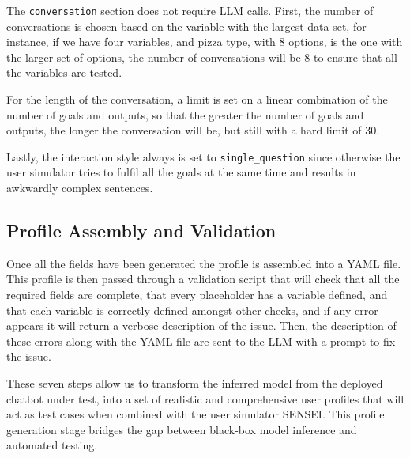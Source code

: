 The \texttt{conversation} section does not require \ac{LLM} calls.
First, the number of conversations is chosen
based on the variable with the largest data set,
for instance, if we have four variables,
and pizza type, with $8$ options, is the one with the larger set of options,
the number of conversations will be $8$ to ensure that all the variables are tested.

For the length of the conversation,
a limit is set on a linear combination
of the number of goals and outputs,
so that the greater the number of goals and outputs,
the longer the conversation will be,
but still with a hard limit of $30$.

Lastly, the interaction style always is set to \texttt{single\_question}
since otherwise the user simulator tries to
fulfil all the goals at the same time
and results in awkwardly complex sentences.

\subsection{Profile Assembly and Validation}

Once all the fields have been generated
the profile is assembled into a YAML file.
This profile is then passed through a validation script
that will check that all the required fields are complete,
that every placeholder has a variable defined,
and that each variable is correctly defined
amongst other checks,
and if any error appears it will return a verbose description of the issue.
Then, the description of these errors along with the YAML file
are sent to the \ac{LLM} with a prompt to fix the issue.


These seven steps allow us to transform the inferred model
from the deployed chatbot under test,
into a set of realistic and comprehensive user profiles
that will act as test cases when combined with the user simulator SENSEI.
This profile generation stage bridges the gap between
black-box model inference and automated testing.
